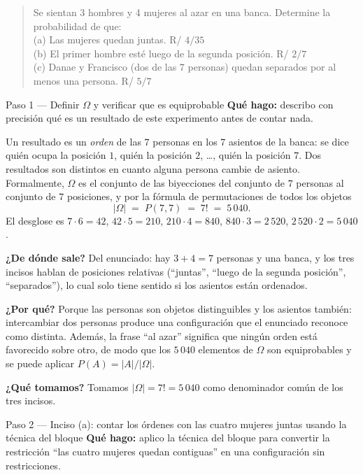 \documentclass[11pt]{article}
\begin{document}
\begin{quote}
Se sientan 3 hombres y 4 mujeres al azar en una banca. Determine la probabilidad de que:\\[2pt]
(a) Las mujeres quedan juntas. \hfill R/ $4/35$\\
(b) El primer hombre est\'e luego de la segunda posici\'on. \hfill R/ $2/7$\\
(c) Danae y Francisco (dos de las 7 personas) quedan separados por al menos una persona. \hfill R/ $5/7$
\end{quote}

\begin{sol}

\begin{paso}{Paso 1 --- Definir $\Omega$ y verificar que es equiprobable}
\textbf{Qu\'e hago:} describo con precisi\'on qu\'e es un resultado de este experimento antes de contar nada.

Un resultado es un \emph{orden} de las $7$ personas en los $7$ asientos de la banca: se dice qui\'en ocupa la posici\'on $1$, qui\'en la posici\'on $2$, \dots, qui\'en la posici\'on $7$. Dos resultados son distintos en cuanto alguna persona cambie de asiento. Formalmente, $\Omega$ es el conjunto de las biyecciones del conjunto de $7$ personas al conjunto de $7$ posiciones, y por la f\'ormula de permutaciones de todos los objetos
\[
|\Omega| \;=\; P(7,7) \;=\; 7! \;=\; 5\,040 .
\]
El desglose es $7\cdot 6=42$, $42\cdot 5=210$, $210\cdot 4=840$, $840\cdot 3=2\,520$, $2\,520\cdot 2=5\,040$.

\textbf{¿De d\'onde sale?} Del enunciado: hay $3+4=7$ personas y una banca, y los tres incisos hablan de posiciones relativas (``juntas'', ``luego de la segunda posici\'on'', ``separados''), lo cual solo tiene sentido si los asientos est\'an ordenados.

\textbf{¿Por qu\'e?} Porque las personas son objetos distinguibles y los asientos tambi\'en: intercambiar dos personas produce una configuraci\'on que el enunciado reconoce como distinta. Adem\'as, la frase ``al azar'' significa que ning\'un orden est\'a favorecido sobre otro, de modo que los $5\,040$ elementos de $\Omega$ son equiprobables y se puede aplicar $P(A)=|A|/|\Omega|$.

\textbf{¿Qu\'e tomamos?} Tomamos $|\Omega|=7!=5\,040$ como denominador com\'un de los tres incisos.
\end{paso}

\begin{paso}{Paso 2 --- Inciso (a): contar los \'ordenes con las cuatro mujeres juntas usando la t\'ecnica del bloque}
\textbf{Qu\'e hago:} aplico la t\'ecnica del bloque para convertir la restricci\'on ``las cuatro mujeres quedan contiguas'' en una configuraci\'on sin restricciones.


\end{paso}
\end{sol}
\end{document}
